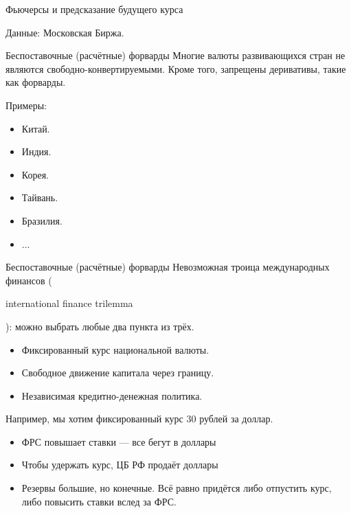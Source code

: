 \documentclass{beamer}
\newcommand{\en}[1]{\begin{otherlanguage}{english}#1\end{otherlanguage}}
\begin{document}
\begin{frame}{Фьючерсы и предсказание будущего курса}
\center
{}

\scriptsize Данные: Московская Биржа.
\end{frame}



\begin{frame}{Беспоставочные (расчётные) форварды}
\justify
Многие валюты развивающихся стран не являются свободно-конвертируемыми. Кроме того, запрещены деривативы, такие как форварды.

\justify
Примеры:
\begin{itemize}
\item Китай.
\item Индия.
\item Корея.
\item Тайвань.
\item Бразилия.
\item ...
\end{itemize}
\end{frame}



\begin{frame}{Беспоставочные (расчётные) форварды}
\justify
Невозможная троица международных финансов (\en{international finance trilemma}): можно выбрать любые два пункта из трёх.
\begin{itemize}
\item Фиксированный курс национальной валюты.
\item Свободное движение капитала через границу.
\item Независимая кредитно-денежная политика.
\end{itemize}

\justify
Например, мы хотим фиксированный курс 30 рублей за доллар.
\begin{itemize}
\justifying
\item ФРС повышает ставки --- все бегут в доллары
\item Чтобы удержать курс, ЦБ РФ продаёт доллары
\item Резервы большие, но конечные. Всё равно придётся либо отпустить курс, либо повысить ставки вслед за ФРС.
\end{itemize}
\end{frame}
\end{document}
